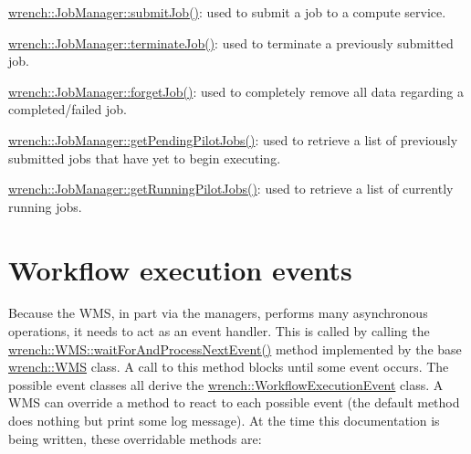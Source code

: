 \begin{DoxyItemize}
\item {\ttfamily \hyperlink{classwrench_1_1_job_manager_a69de09b0d5ae34cbcf9208be88901728}{wrench\+::\+Job\+Manager\+::submit\+Job()}}\+: used to submit a job to a compute service.
\item {\ttfamily \hyperlink{classwrench_1_1_job_manager_aba90476a89bc0748497879bdf07eea9c}{wrench\+::\+Job\+Manager\+::terminate\+Job()}}\+: used to terminate a previously submitted job.
\item {\ttfamily \hyperlink{classwrench_1_1_job_manager_ab10f770cc7ce3c022f889ad9cc3fcf0b}{wrench\+::\+Job\+Manager\+::forget\+Job()}}\+: used to completely remove all data regarding a completed/failed job.
\item {\ttfamily \hyperlink{classwrench_1_1_job_manager_ad7f55858aa45b87289d5f35c4ccfad56}{wrench\+::\+Job\+Manager\+::get\+Pending\+Pilot\+Jobs()}}\+: used to retrieve a list of previously submitted jobs that have yet to begin executing.
\item {\ttfamily \hyperlink{classwrench_1_1_job_manager_aeb91b23edf40378e49929f47e95f1ea6}{wrench\+::\+Job\+Manager\+::get\+Running\+Pilot\+Jobs()}}\+: used to retrieve a list of currently running jobs.
\end{DoxyItemize}\hypertarget{wrench-101_wrench-101-WMS-events}{}\section{Workflow execution events}\label{wrench-101_wrench-101-WMS-events}
Because the W\+MS, in part via the managers, performs many asynchronous operations, it needs to act as an event handler. This is called by calling the {\ttfamily \hyperlink{classwrench_1_1_w_m_s_a2923b4ec6f7e233693199154d5206d5f}{wrench\+::\+W\+M\+S\+::wait\+For\+And\+Process\+Next\+Event()}} method implemented by the base {\ttfamily \hyperlink{classwrench_1_1_w_m_s}{wrench\+::\+W\+MS}} class. A call to this method blocks until some event occurs. The possible event classes all derive the {\ttfamily \hyperlink{classwrench_1_1_workflow_execution_event}{wrench\+::\+Workflow\+Execution\+Event}} class. A W\+MS can override a method to react to each possible event (the default method does nothing but print some log message). At the time this documentation is being written, these overridable methods are\+:



